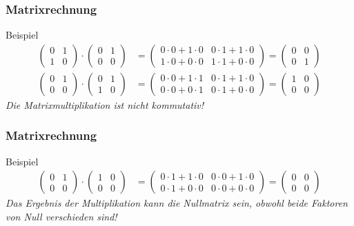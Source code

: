 \documentclass{beamer}
\renewcommand{\emph}[1]{{\textcolor{solarizedRed}{\itshape #1}}}
\newcommand{\mytitle}{Matrixrechnung}
\begin{document}
\begin{frame}\frametitle{\mytitle}
	\begin{block}{Beispiel}
		\begin{align*}
			\begin{pmatrix} 0&1\\1&0\end{pmatrix}\cdot	
			\begin{pmatrix} 0&1\\0&0\end{pmatrix}
							 &=
			\begin{pmatrix} 0\cdot 0+1\cdot 0&0\cdot 1+1\cdot 0\\1\cdot 0+0\cdot 0&1\cdot 1+0\cdot 0\end{pmatrix}
		= \begin{pmatrix} 0&0\\0&1\end{pmatrix}\\
			\begin{pmatrix} 0&1\\0&0\end{pmatrix} \cdot	\begin{pmatrix} 0&1\\1&0\end{pmatrix}
							 &=
			\begin{pmatrix} 0\cdot 0+1\cdot 1&0\cdot 1+1\cdot 0\\0\cdot 0+0\cdot 1&0\cdot 1+0\cdot 0\end{pmatrix}
		= \begin{pmatrix} 1&0\\0&0\end{pmatrix}
		\end{align*}
	\emph{Die Matrixmultiplikation ist nicht kommutativ!}
	\end{block}
\end{frame}

\begin{frame}\frametitle{\mytitle}
	\begin{block}{Beispiel}
		\begin{align*}
			\begin{pmatrix} 0&1\\0&0\end{pmatrix}\cdot	
			\begin{pmatrix} 1&0\\0&0\end{pmatrix}
							 &=
			\begin{pmatrix} 0\cdot 1+1\cdot 0&0\cdot 0+1\cdot 0\\0\cdot 1+0\cdot 0&0\cdot 0+0\cdot 0\end{pmatrix}
		= \begin{pmatrix} 0&0\\0&0\end{pmatrix}
		\end{align*}
	\emph{Das Ergebnis der Multiplikation kann die Nullmatrix sein, obwohl beide Faktoren von Null verschieden sind!}
	\end{block}
\end{frame}
\end{document}
